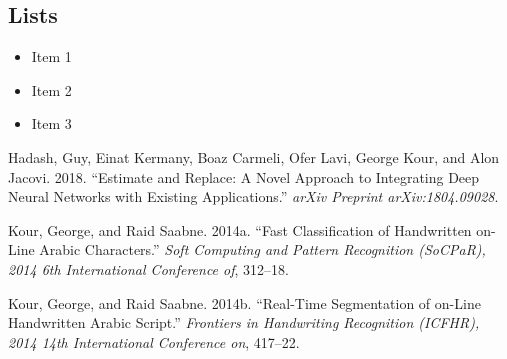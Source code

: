 \documentclass{article}
\providecommand{\tightlist}{%
  \setlength{\itemsep}{0pt}\setlength{\parskip}{0pt}}
\newlength{\cslhangindent}
\newenvironment{CSLReferences}[2] %
 {\begin{list}{}{%
  \setlength{\itemindent}{0pt}
  \setlength{\leftmargin}{0pt}
  \setlength{\parsep}{0pt}
  \ifodd #1
   \setlength{\leftmargin}{\cslhangindent}
   \setlength{\itemindent}{-1\cslhangindent}
  \fi
  \setlength{\itemsep}{#2\baselineskip}}}
 {\end{list}}
\begin{document}
\subsection{Lists}\label{lists}

\begin{itemize}
\tightlist
\item
  Item 1
\item
  Item 2
\item
  Item 3
\end{itemize}

\protect{}\label{refs}
\begin{CSLReferences}{1}{1}
Hadash, Guy, Einat Kermany, Boaz Carmeli, Ofer Lavi, George Kour, and
Alon Jacovi. 2018. {``Estimate and Replace: A Novel Approach to
Integrating Deep Neural Networks with Existing Applications.''}
\emph{arXiv Preprint arXiv:1804.09028}.

Kour, George, and Raid Saabne. 2014a. {``Fast Classification of
Handwritten on-Line Arabic Characters.''} \emph{Soft Computing and
Pattern Recognition (SoCPaR), 2014 6th International Conference of},
312--18.

Kour, George, and Raid Saabne. 2014b. {``Real-Time Segmentation of
on-Line Handwritten Arabic Script.''} \emph{Frontiers in Handwriting
Recognition (ICFHR), 2014 14th International Conference on}, 417--22.

\end{CSLReferences}



\end{document}
